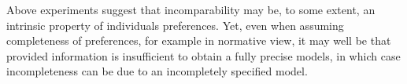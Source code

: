 \documentclass[french, english]{llncs}
\begin{document}
	
	
	Above experiments suggest that incomparability may be, to some extent, an intrinsic property of individuals preferences. Yet, even when assuming completeness of preferences, for example in normative view, it may well be that provided information is insufficient to obtain a fully precise models, in which case incompleteness can be due to an incompletely specified model. 
	
\end{document}
